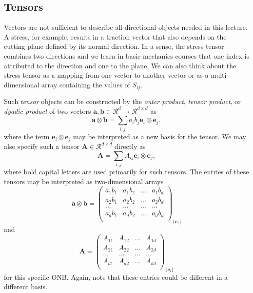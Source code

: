 \subsection{Tensors}
Vectors are not sufficient to describe all directional objects needed in this lecture. A stress, for example, results in a traction vector that also depends on the cutting plane defined by its normal direction. 
In a sense, the stress tensor combines two directions and we learn in basic mechanics courses that one index is attributed to the direction and one to the plane. We can also think about the stress tensor as a mapping from one vector to another vector or as a multi-dimensional array containing the values of $S_{ij}$.

Such \emph{tensor} objects can be constructed by the \emph{outer product}, \emph{tensor product}, or \emph{dyadic product} of two vectors $\mathbf{a}, \mathbf{b} \in \mathcal{R}^d \rightarrow \mathcal{R}^{d \times d}$ as 
\begin{equation}
    \label{eq:tensorproduct}
    \mathbf{a} \otimes \mathbf{b} = \sum_{i,j} a_i b_j \mathbf{e}_i \otimes \mathbf{e}_j,
\end{equation}
where the term $\mathbf{e}_i \otimes \mathbf{e}_j$ may be interpreted as a new basis for the tensor. We may also specify such a tensor $\mathbf{A} \in \mathcal{R}^{d \times d}$ directly as 
\begin{equation}
    \mathbf{A} = \sum_{i,j} A_{ij} \mathbf{e}_i \otimes \mathbf{e}_j ,
\end{equation}
where bold capital letters are used primarily for such tensors.
The entries of these tensors may be interpreted as two-dimensional arrays
\begin{equation}
    \mathbf{a} \otimes \mathbf{b} =
    \begin{pmatrix}
         a_1 b_1    & a_1 b_2   & \dots   & a_1 b_d  \\
         a_2 b_1    & a_2 b_2   & \dots   & a_2 b_d  \\
         \dots      & \dots     & \dots   & \dots  \\
         a_d b_1    & a_d b_2   & \dots   & a_d b_d  \\
    \end{pmatrix}_{\{\mathbf{e}_i\}}
\end{equation}
and 
\begin{equation}
    \mathbf{A} =
    \begin{pmatrix}
         A_{11}    & A_{12}   & \dots   & A_{1d}  \\
         A_{21}    & A_{22}   & \dots   & A_{2d}  \\
         \dots      & \dots     & \dots   & \dots  \\
         A_{d1}    & A_{d2}   & \dots   & A_{dd}  \\
    \end{pmatrix}_{\{\mathbf{e}_i\}}
\end{equation}
for this specific ONB. Again, note that these entries could be different in a different basis.

